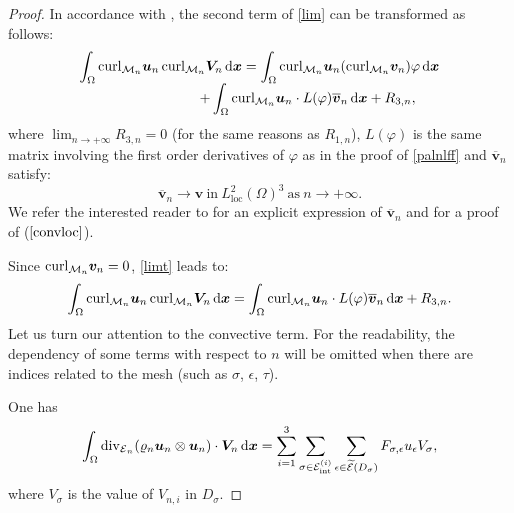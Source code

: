 \documentclass{amsart}
\numberwithin{equation}{section}
\begin{document}
\begin{proof}
In accordance with \cite{eymard2010convergence},  the second term of \eqref{lim} can be transformed as follows:
\begin{equation}
\begin{array}{l} \displaystyle
\int_\Omega  {{\rm curl}}_{{{\mathcal M}}_n} {{\boldsymbol u}}_n \,  {{\rm curl}}_{{{\mathcal M}}_n}  {\bm{V}}_n {\, {\rm d}{{\boldsymbol x}}} =
\int_\Omega {{\rm curl}}_{{{\mathcal M}}_n} {{\boldsymbol u}}_n ({{\rm curl}}_{{{\mathcal M}}_n} {{\boldsymbol v}}_n) \varphi {\, {\rm d}{{\boldsymbol x}}} 
\\ \displaystyle \hspace{20ex}
+ \int_\Omega {{\rm curl}}_{{{\mathcal M}}_n}  {{\boldsymbol u}}_n \cdot L(\varphi) {\overline{{\boldsymbol v}}_n} {\, {\rm d}{{\boldsymbol x}}} +R_{3,n},
\end{array}
\label{limt}
\end{equation}
where $\lim_{{n {\rightarrow} + \infty}} R_{3,n} =0$ (for the same reasons as $R_{1,n}$), $L(\varphi)$ is the same matrix involving the first order derivatives of $\varphi$ as in the proof of \eqref{palnlff} and
 $\overline{{\boldsymbol v}}_n$  satisfy:
\begin{equation}\label{convloc}
\overline{{\boldsymbol v}}_n \to {{\boldsymbol v}}~ \text{in}~ L^2_{\text{loc}}(\Omega)^3~\text{as}~ n \to +\infty.
\end{equation}
We refer the interested reader to \cite{eymard2010convergence} for an explicit expression of $\overline{{\boldsymbol v}}_n$ and for a proof of ($\ref{convloc}$).

Since ${{\rm curl}}_{{{\mathcal M}}_n}  {{\boldsymbol v}}_n=0$, \eqref{limt} leads to:
\begin{equation}
\int_\Omega  {{\rm curl}}_{{{\mathcal M}}_n}  {{\boldsymbol u}}_n \,  {{\rm curl}}_{{{\mathcal M}}_n}  {\bm{V}}_n {\, {\rm d}{{\boldsymbol x}}} =
 \int_\Omega {{\rm curl}}_{{{\mathcal M}}_n} {{\boldsymbol u}}_n \cdot L(\varphi) {\overline{{\boldsymbol v}}_n} {\, {\rm d}{{\boldsymbol x}}} +R_{3,n}.
\label{limc}\end{equation}
Let us turn our attention to the convective term. For the readability, the dependency of some terms with respect to $n$ will be omitted when there are indices
related to the mesh (such as ${{\sigma}}$, ${\epsilon}$, ${\tau}$).

One has
\[
 \int_\Omega \operatorname{div}_{\operatorname{{\mathcal{E}}}_n}({\varrho}_n {{\boldsymbol u}}_n \otimes {{\boldsymbol u}}_n) \cdot {\bm{V}}_n {\, {\rm d}{{\boldsymbol x}}} = \sum_{i=1}^3 \sum_{{{\sigma}} \in {{\mathcal E}_{\mathrm{int}}^{(i)}}} \sum_{{\epsilon} \in {\widetilde {{\mathcal E}}}(D_{{\sigma}})}
F_{{{\sigma}},{\epsilon}} u_{\epsilon} V_{{\sigma}},
\]
where $V_{{\sigma}}$ is the value of $V_{n,i}$ in $D_{{\sigma}}$.


\end{proof}
\end{document}
